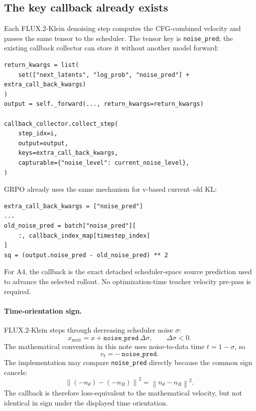 \documentclass[11pt,a4paper]{article}
\newcommand{\norm}[1]{\left\lVert #1 \right\rVert}
\theoremstyle{plain}
\theoremstyle{definition}
\begin{document}
\subsection{The key callback already exists}

Each FLUX.2-Klein denoising step computes the CFG-combined velocity and passes the same tensor to
the scheduler.  The tensor key is \texttt{noise\_pred}; the existing callback collector can store
it without another model forward:
\begin{lstlisting}[style=python,caption={Existing callback contract in \texttt{flux2\_klein.py}.}]
return_kwargs = list(
    set(["next_latents", "log_prob", "noise_pred"] + extra_call_back_kwargs)
)
output = self._forward(..., return_kwargs=return_kwargs)

callback_collector.collect_step(
    step_idx=i,
    output=output,
    keys=extra_call_back_kwargs,
    capturable={"noise_level": current_noise_level},
)
\end{lstlisting}

GRPO already uses the same mechanism for v-based current--old KL:
\begin{lstlisting}[style=python,caption={Existing precedent in \texttt{trainers/grpo.py}.}]
extra_call_back_kwargs = ["noise_pred"]
...
old_noise_pred = batch["noise_pred"][
    :, callback_index_map[timestep_index]
]
sq = (output.noise_pred - old_noise_pred) ** 2
\end{lstlisting}

For A4, the callback is the exact detached scheduler-space source prediction used to advance the
selected rollout.  No optimization-time teacher velocity pre-pass is required.

\paragraph{Time-orientation sign.}
FLUX.2-Klein steps through decreasing scheduler noise $\sigma$:
\begin{equation}
x_{\mathrm{next}}=x+\texttt{noise\_pred}\,\Delta\sigma,
\qquad
\Delta\sigma<0.
\end{equation}
The mathematical convention in this note uses noise-to-data time $t=1-\sigma$, so
\begin{equation}
v_t=-\,\texttt{noise\_pred}.
\label{eq:code-sign}
\end{equation}
The implementation may compare \texttt{noise\_pred} directly because the common sign cancels:
\begin{equation}
\norm{(-n_\theta)-(-n_B)}^2=\norm{n_\theta-n_B}^2.
\end{equation}
The callback is therefore loss-equivalent to the mathematical velocity, but not identical in
sign under the displayed time orientation.
\end{document}

